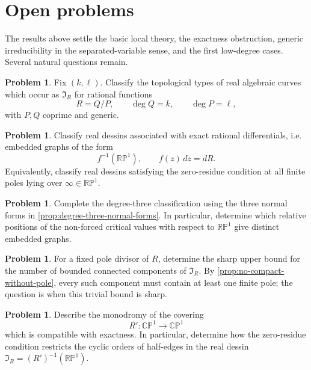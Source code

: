\documentclass[11pt,reqno]{amsart}
\theoremstyle{definition}
\newtheorem{problem}[theorem]{Problem}
\theoremstyle{remark}
\newcommand{\CP}{\mathbb {CP}}
\newcommand{\RP}{\mathbb {RP}}
\newcommand{\I}{\mathfrak I}
\begin{document}
\section{Open problems}

The results above settle the basic local theory, the exactness obstruction, generic irreducibility in the separated-variable sense, and the first low-degree cases.  Several natural questions remain.

\begin{problem}\label{prob:hilbert}
Fix $(k,\ell)$.  Classify the topological types of real algebraic curves which occur as $\I_R$ for rational functions
\[
        R=Q/P,
        \qquad \deg Q=k,
        \qquad \deg P=\ell,
\]
with $P,Q$ coprime and generic.
\end{problem}

\begin{problem}\label{prob:dessin}
Classify real dessins associated with exact rational differentials, i.e. embedded graphs of the form
\[
        f^{-1}(\RP^1),
        \qquad f(z)\,dz=dR.
\]
Equivalently, classify real dessins satisfying the zero-residue condition at all finite poles lying over $\infty\in\RP^1$.
\end{problem}

\begin{problem}\label{prob:degree-three}
Complete the degree-three classification using the three normal forms in \cref{prop:degree-three-normal-forms}.  In particular, determine which relative positions of the non-forced critical values with respect to $\RP^1$ give distinct embedded graphs.
\end{problem}

\begin{problem}\label{prob:components}
For a fixed pole divisor of $R$, determine the sharp upper bound for the number of bounded connected components of $\I_R$.  By \cref{prop:no-compact-without-pole}, every such component must contain at least one finite pole; the question is when this trivial bound is sharp.
\end{problem}

\begin{problem}\label{prob:monodromy}
Describe the monodromy of the covering
\[
        R':\CP^1\to\CP^1
\]
which is compatible with exactness.  In particular, determine how the zero-residue condition restricts the cyclic orders of half-edges in the real dessin $\I_R=(R')^{-1}(\RP^1)$.
\end{problem}
\end{document}
